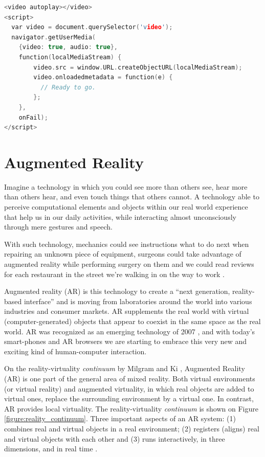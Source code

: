 \begin{lstlisting}[language=C++,label={lst:get_user_media},caption=Capture and display microphone and camera]
<video autoplay></video>
<script>
  var video = document.querySelector('video');
  navigator.getUserMedia(
    {video: true, audio: true},
    function(localMediaStream) {
        video.src = window.URL.createObjectURL(localMediaStream);
        video.onloadedmetadata = function(e) {
          // Ready to go.
        };
    },
    onFail);
</script>
\end{lstlisting}


\section{Augmented Reality} %
\label{sec:basic_concepts:augmented_reality}

Imagine a technology in which you could see more than others see, hear more than others hear, and even touch things that others cannot. A technology able to perceive computational elements and objects within our real world experience that help us in our daily activities, while interacting almost unconsciously through mere gestures and speech.

With such technology, mechanics could see instructions what to do next when repairing an unknown piece of equipment, surgeons could take advantage of augmented reality while performing surgery on them and we could read reviews for each restaurant in the street we're walking in on the way to work \cite{Krevelen2010}.

Augmented reality (AR) is this technology to create a ``next generation, reality-based interface'' \cite{Krevelen2010} and is moving from laboratories around the world into various industries and consumer markets. AR supplements the real world with virtual (computer-generated) objects that appear to coexist in the same space as the real world. AR was recognized as an emerging technology of 2007 \cite{Krevelen2010}, and with today's smart-phones and AR browsers we are starting to embrace this very new and exciting kind of human-computer interaction.

On the reality-virtuality \textit{continuum} by Milgram and Ki \cite{Mistry2009}, Augmented Reality (AR) is one part of the general area of mixed reality. Both virtual environments (or virtual reality) and augmented virtuality, in which real objects are added to virtual ones, replace the surrounding environment by a virtual one. In contrast, AR provides local virtuality. The reality-virtuality \textit{continuum} is shown on Figure \ref{figure:reality_continuum}. Three important aspects of an AR system: (1) combines real and virtual objects in a real environment; (2) registers (aligns) real and virtual objects with each other and (3) runs interactively, in three dimensions, and in real time \cite{Benford1998}.

